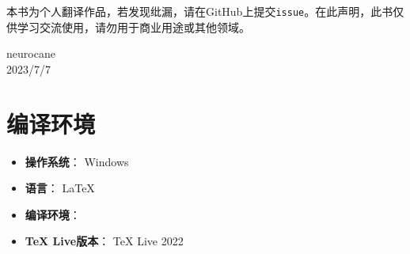 \documentclass{ctexbook}
\begin{document}
本书为个人翻译作品，若发现纰漏，请在GitHub上提交\verb|issue|。在此声明，此书仅供学习交流使用，请勿用于商业用途或其他领域。

\vfill

\begin{flushright}
    neurocane\\
    2023/7/7
\end{flushright}

\newpage

\section*{编译环境}

\begin{itemize}
    \item \textbf{操作系统}： Windows
    \item \textbf{语言}： \LaTeX
    \item \textbf{编译环境}： \XeLaTeX
    \item \textbf{TeX Live版本}： TeX Live 2022
\end{itemize}

\tableofcontents

\mainmatter



\backmatter



	
\end{document}
